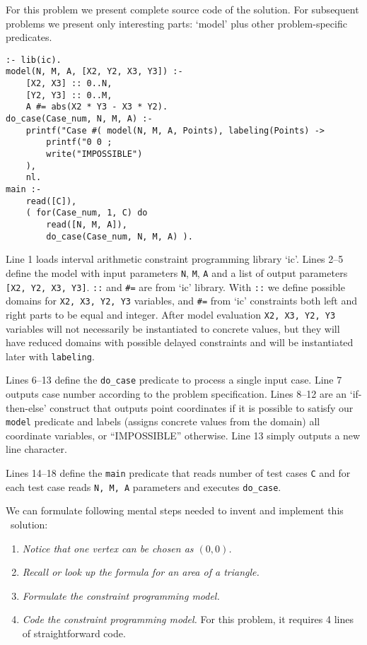\documentclass{acm_proc_article-sp}
\begin{document}
For this problem we present complete source code of the solution. 
For subsequent problems we present only interesting parts: `model' plus other problem-specific predicates.

\begin{lstlisting}[caption={Complete \eclipse\ program for the ``Triangle Areas'' problem}]
:- lib(ic).
model(N, M, A, [X2, Y2, X3, Y3]) :-
    [X2, X3] :: 0..N,
    [Y2, Y3] :: 0..M,
    A #= abs(X2 * Y3 - X3 * Y2).
do_case(Case_num, N, M, A) :-
    printf("Case #( model(N, M, A, Points), labeling(Points) ->
        printf("0 0 ; 
        write("IMPOSSIBLE") 
    ),
    nl.
main :-
    read([C]), 
    ( for(Case_num, 1, C) do 
        read([N, M, A]),
        do_case(Case_num, N, M, A) ).
\end{lstlisting}

Line 1 loads interval arithmetic constraint programming library `ic'. 
Lines 2--5 define the model with input parameters \texttt{N}, \texttt{M}, \texttt{A} and a list of output parameters \texttt{[X2, Y2, X3, Y3]}.
\texttt{::} and \texttt{\#=} are from `ic' library. 
With \texttt{::} we define possible domains for \texttt{X2, X3, Y2, Y3} variables,
and \texttt{\#=} from `ic' constraints both left and right parts to be equal and integer.
After model evaluation \texttt{X2, X3, Y2, Y3} variables will not necessarily be instantiated to concrete values, but they will have reduced domains with possible delayed constraints 
and will be instantiated later with \texttt{labeling}.

Lines 6--13 define the \texttt{do\_case} predicate to process a single input case. Line 7 outputs case number according to the problem specification.
Lines 8--12 are an `if-then-else' construct that outputs point coordinates if it is possible to satisfy our \texttt{model} predicate and labels (assigns concrete values from the domain)
all coordinate variables, or ``IMPOSSIBLE'' otherwise.
Line 13 simply outputs a new line character.

Lines 14--18 define the \texttt{main} predicate that reads number of test cases \texttt{C} and for each test case reads \texttt{N, M, A} parameters and executes \texttt{do\_case}.

We can formulate following mental steps needed to invent and implement this \eclipse\ solution:

\begin{enumerate}
\item \textit{Notice that one vertex can be chosen as $(0,0)$.}
\item \textit{Recall or look up the formula for an area of a triangle.}
\item \textit{Formulate the constraint programming model.}
\item \textit{Code the constraint programming model.} 
For this problem, it requires 4 lines of straightforward code.
\end{enumerate}
\end{document}
